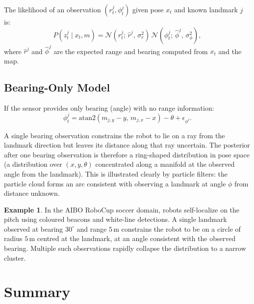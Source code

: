 \documentclass[11pt,a4paper]{article}
\theoremstyle{definition}
\newtheorem{example}{Example}[section]
\theoremstyle{plain}
\theoremstyle{remark}
\begin{document}
The likelihood of an observation $(r_t^j, \phi_t^j)$ given pose $x_t$ and known landmark $j$ is:
\[
    P(z_t^j \mid x_t, m) = \mathcal{N}(r_t^j;\, \hat{r}^j,\, \sigma_r^2)\,\mathcal{N}(\phi_t^j;\, \hat{\phi}^j,\, \sigma_\phi^2),
\]
where $\hat{r}^j$ and $\hat{\phi}^j$ are the expected range and bearing computed from $x_t$ and the map.

\subsection{Bearing-Only Model}

If the sensor provides only bearing (angle) with no range information:
\[
    \phi_t^j = \mathrm{atan2}(m_{j,y} - y,\, m_{j,x} - x) - \theta + \epsilon_{\phi^j}.
\]

A single bearing observation constrains the robot to lie on a ray from the landmark direction but leaves its distance along that ray uncertain. The posterior after one bearing observation is therefore a ring-shaped distribution in pose space (a distribution over $(x, y, \theta)$ concentrated along a manifold at the observed angle from the landmark). This is illustrated clearly by particle filters: the particle cloud forms an arc consistent with observing a landmark at angle $\phi$ from distance unknown.

\begin{example}
In the AIBO RoboCup soccer domain, robots self-localize on the pitch using coloured beacons and white-line detections. A single landmark observed at bearing $30^\circ$ and range $5\,\mathrm{m}$ constrains the robot to be on a circle of radius $5\,\mathrm{m}$ centred at the landmark, at an angle consistent with the observed bearing. Multiple such observations rapidly collapse the distribution to a narrow cluster.
\end{example}

\section{Summary}
\end{document}
